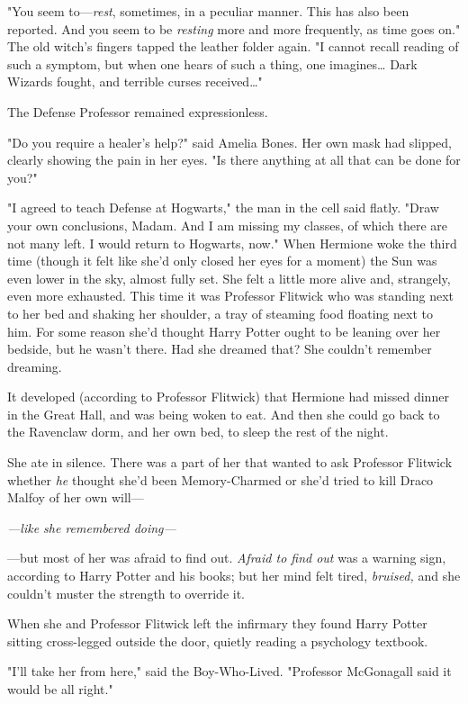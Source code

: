 "You seem to---\emph{rest}, sometimes, in a peculiar manner. This has also been 
reported. And you seem to be \emph{resting} more and more frequently, as time 
goes on." The old witch's fingers tapped the leather folder again. "I cannot 
recall reading of such a symptom, but when one hears of such a thing, one 
imagines{\ldots} Dark Wizards fought, and terrible curses received{\ldots}"

The Defense Professor remained expressionless.

"Do you require a healer's help?" said Amelia Bones. Her own mask had slipped, 
clearly showing the pain in her eyes. "Is there anything at all that can be 
done for you?"

"I agreed to teach Defense at Hogwarts," the man in the cell said flatly. "Draw 
your own conclusions, Madam. And I am missing my classes, of which there are 
not many left. I would return to Hogwarts, now."
\sbreak
When Hermione woke the third time (though it felt like she'd only closed her 
eyes for a moment) the Sun was even lower in the sky, almost fully set. She 
felt a little more alive and, strangely, even more exhausted. This time it was 
Professor Flitwick who was standing next to her bed and shaking her shoulder, a 
tray of steaming food floating next to him. For some reason she'd thought Harry 
Potter ought to be leaning over her bedside, but he wasn't there. Had she 
dreamed that? She couldn't remember dreaming.

It developed (according to Professor Flitwick) that Hermione had missed dinner 
in the Great Hall, and was being woken to eat. And then she could go back to 
the Ravenclaw dorm, and her own bed, to sleep the rest of the night.

She ate in silence. There was a part of her that wanted to ask Professor 
Flitwick whether \emph{he} thought she'd been Memory-Charmed or she'd tried to 
kill Draco Malfoy of her own will---

\emph{---like she remembered doing---}

---but most of her was afraid to find out. \emph{Afraid to find out} was a 
warning sign, according to Harry Potter and his books; but her mind felt tired, 
\emph{bruised,} and she couldn't muster the strength to override it.

When she and Professor Flitwick left the infirmary they found Harry Potter 
sitting cross-legged outside the door, quietly reading a psychology textbook.

"I'll take her from here," said the Boy-Who-Lived. "Professor McGonagall said 
it would be all right."

